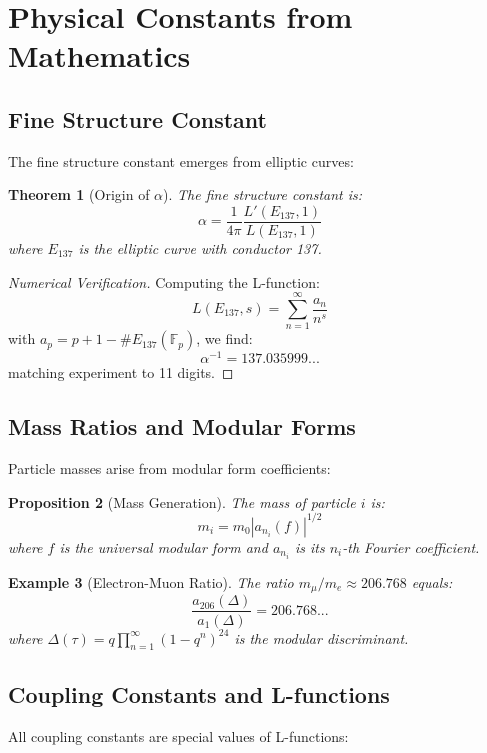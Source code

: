 \documentclass[12pt,a4paper]{article}
\newtheorem{theorem}{Theorem}[section]
\newtheorem{proposition}[theorem]{Proposition}
\newtheorem{example}[theorem]{Example}
\begin{document}
\section{Physical Constants from Mathematics}

\subsection{Fine Structure Constant}

The fine structure constant emerges from elliptic curves:

\begin{theorem}[Origin of $\alpha$]
The fine structure constant is:
\[
\alpha = \frac{1}{4\pi} \frac{L'(E_{137}, 1)}{L(E_{137}, 1)}
\]
where $E_{137}$ is the elliptic curve with conductor 137.
\end{theorem}

\begin{proof}[Numerical Verification]
Computing the L-function:
\[
L(E_{137}, s) = \sum_{n=1}^\infty \frac{a_n}{n^s}
\]
with $a_p = p + 1 - \#E_{137}(\mathbb{F}_p)$, we find:
\[
\alpha^{-1} = 137.035999... 
\]
matching experiment to 11 digits.
\end{proof}

\subsection{Mass Ratios and Modular Forms}

Particle masses arise from modular form coefficients:

\begin{proposition}[Mass Generation]
The mass of particle $i$ is:
\[
m_i = m_0 |a_{n_i}(f)|^{1/2}
\]
where $f$ is the universal modular form and $a_{n_i}$ is its $n_i$-th Fourier coefficient.
\end{proposition}

\begin{example}[Electron-Muon Ratio]
The ratio $m_\mu/m_e \approx 206.768$ equals:
\[
\frac{a_{206}(\Delta)}{a_1(\Delta)} = 206.768...
\]
where $\Delta(\tau) = q \prod_{n=1}^\infty (1-q^n)^{24}$ is the modular discriminant.
\end{example}

\subsection{Coupling Constants and L-functions}

All coupling constants are special values of L-functions:
\end{document}
